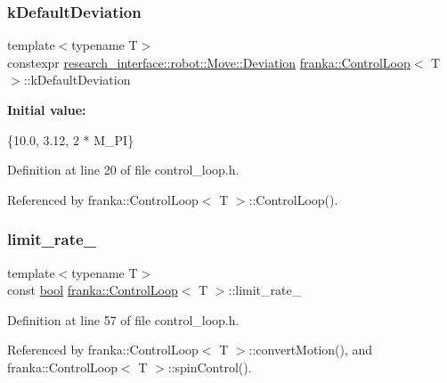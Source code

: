\subsubsection{\texorpdfstring{k\+Default\+Deviation}{kDefaultDeviation}}
{\footnotesize\ttfamily template$<$typename T$>$ \\
constexpr \hyperlink{structresearch__interface_1_1robot_1_1Move_1_1Deviation}{research\+\_\+interface\+::robot\+::\+Move\+::\+Deviation} \hyperlink{classfranka_1_1ControlLoop}{franka\+::\+Control\+Loop}$<$ T $>$\+::k\+Default\+Deviation\hspace{0.3cm}{\ttfamily [static]}}

{\bfseries Initial value\+:}
\begin{DoxyCode}
\{10.0, 3.12,
                                                                                2 * M\_PI\}
\end{DoxyCode}


Definition at line 20 of file control\+\_\+loop.\+h.



Referenced by franka\+::\+Control\+Loop$<$ T $>$\+::\+Control\+Loop().

\mbox{\label{classfranka_1_1ControlLoop_a660f32d739c7f7ed05fa97b06220b98b}} 
\subsubsection{\texorpdfstring{limit\+\_\+rate\+\_\+}{limit\_rate\_}}
{\footnotesize\ttfamily template$<$typename T$>$ \\
const \hyperlink{classbool}{bool} \hyperlink{classfranka_1_1ControlLoop}{franka\+::\+Control\+Loop}$<$ T $>$\+::limit\+\_\+rate\+\_\+\hspace{0.3cm}{\ttfamily [private]}}



Definition at line 57 of file control\+\_\+loop.\+h.



Referenced by franka\+::\+Control\+Loop$<$ T $>$\+::convert\+Motion(), and franka\+::\+Control\+Loop$<$ T $>$\+::spin\+Control().

\mbox{\label{classfranka_1_1ControlLoop_a8304d484624d562c70e3572d5037871b}} 
